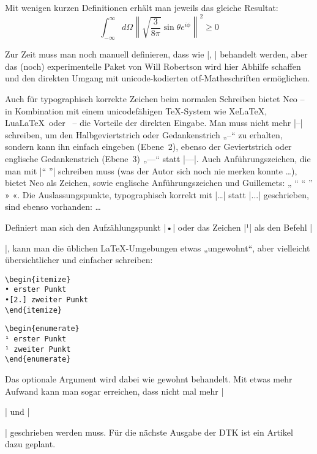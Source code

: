 \documentclass[ngerman]{dtk}
\newcommand\LuaLaTeX{Lua\LaTeX}
\newcommand\XeLaTeX{Xe\LaTeX}
\begin{document}
{{Mit wenigen kurzen Definitionen erhält man jeweils das gleiche Resultat:
\[\int_{-\infty}^\infty d\Omega \left\|\sqrt{\frac{3}{8\pi}} \sin\theta e^{i\phi}\right\|^2 \geq 0\]

Zur Zeit muss man noch manuell definieren, dass  wie |\int, \geq| behandelt werden, aber das (noch) experimentelle Paket  von Will Robertson wird hier Abhilfe schaffen und den direkten Umgang mit unicode-kodierten otf-Matheschriften ermöglichen.

Auch für typographisch korrekte Zeichen beim normalen Schreiben bietet Neo – in Kombination mit einem unicodefähigen \TeX-System wie \XeLaTeX, \LuaLaTeX\ oder \ConTeXt\ – die Vorteile der direkten Eingabe. Man muss nicht mehr |--| schreiben, um den Halbgeviertstrich oder Gedankenstrich „–“ zu erhalten, sondern kann ihn einfach eingeben (Ebene~2), ebenso der Geviertstrich oder englische Gedankenstrich (Ebene~3) „—“ statt |---|. Auch Anführungszeichen, die man mit  |"` "'| schreiben muss (was der Autor sich noch nie merken konnte \dots{}), bietet Neo als Zeichen, sowie englische Anführungszeichen und Guillemets: „ “ “ ”  » «. Die Auslassungspunkte, typographisch korrekt mit |\dots| statt |...| geschrieben, sind ebenso vorhanden: …

Definiert man sich den Aufzählungspunkt |•| oder das Zeichen |¹| als den Befehl |\item|, kann man die üblichen \LaTeX-Umgebungen etwas „ungewohnt“, aber vielleicht übersichtlicher und einfacher schreiben:

\begin{minipage}{.4\textwidth}
\begin{verbatim}
\begin{itemize}
• erster Punkt
•[2.] zweiter Punkt
\end{itemize} 
\end{verbatim}
\end{minipage}
\hfill
\begin{minipage}{.4\textwidth}
\begin{verbatim}
\begin{enumerate}
¹ erster Punkt
¹ zweiter Punkt
\end{enumerate} 
\end{verbatim}
\end{minipage}

Das optionale Argument wird dabei wie gewohnt behandelt. Mit etwas mehr Aufwand kann man sogar erreichen, dass nicht mal mehr |\begin{itemize}| und |\end{itemize}| geschrieben werden muss. Für die nächste Ausgabe der DTK ist ein Artikel dazu geplant.

}}
\end{document}
